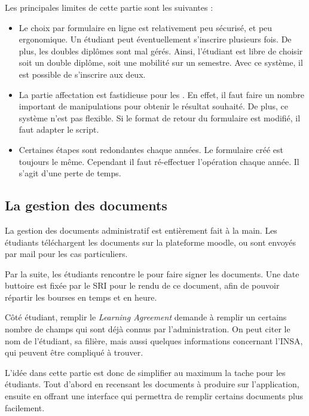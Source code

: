 		Les principales limites de cette partie sont les suivantes : 
		\begin{itemize}
		\item Le choix par formulaire en ligne est relativement peu sécurisé, et peu ergonomique. Un étudiant peut  éventuellement s'inscrire plusieurs fois. De plus, les doubles diplômes sont mal gérés. Ainsi, l'étudiant est libre de choisir soit un double diplôme, soit une mobilité sur un semestre. Avec ce système, il est possible de s'inscrire aux deux. 
		\item La partie affectation est fastidieuse  pour les \ris. En effet, il faut faire un nombre important de manipulations pour obtenir le résultat  souhaité. De plus, ce système n'est pas flexible. Si le format de retour du formulaire est modifié, il faut adapter le script. 
		\item Certaines étapes sont redondantes chaque années. Le formulaire créé est toujours le même. Cependant il faut ré-effectuer l'opération chaque année. Il s'agit d'une perte de temps. 
		\end{itemize}

		\subsection{La gestion  des documents}
		La gestion des documents administratif est entièrement fait à la main. Les étudiants téléchargent les documents sur la plateforme moodle, ou sont envoyés par mail pour les cas particuliers. 
                
                Par la suite, les étudiants rencontre le \ri pour faire signer les documents. Une date buttoire est fixée par le SRI pour le rendu de ce document, afin de pouvoir répartir les bourses en temps et en heure. 

\medbreak

Côté étudiant, remplir le \textit{Learning Agreement} demande à remplir un certains nombre de champs qui sont déjà connus par l'administration. On peut citer le nom de l'étudiant, sa filière, mais aussi quelques informations concernant l'INSA, qui peuvent être compliqué à trouver. 

\medbreak

L'idée dans cette partie est donc de simplifier au maximum la tache pour les étudiants. Tout d'abord en recensant les documents à produire sur l'application, ensuite en offrant une interface qui permettra de remplir certains documents plus facilement. 

